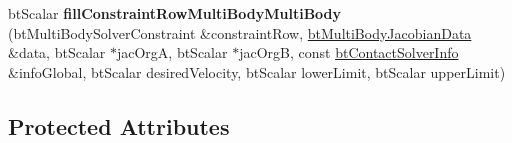 \begin{DoxyCompactItemize}
\item 
\mbox{\label{classbtMultiBodyConstraint_a8bc70e38d498ba56f1c562a004235368}} 
bt\+Scalar {\bfseries fill\+Constraint\+Row\+Multi\+Body\+Multi\+Body} (bt\+Multi\+Body\+Solver\+Constraint \&constraint\+Row, \hyperlink{structbtMultiBodyJacobianData}{bt\+Multi\+Body\+Jacobian\+Data} \&data, bt\+Scalar $\ast$jac\+OrgA, bt\+Scalar $\ast$jac\+OrgB, const \hyperlink{structbtContactSolverInfo}{bt\+Contact\+Solver\+Info} \&info\+Global, bt\+Scalar desired\+Velocity, bt\+Scalar lower\+Limit, bt\+Scalar upper\+Limit)
\end{DoxyCompactItemize}
\subsection*{Protected Attributes}
